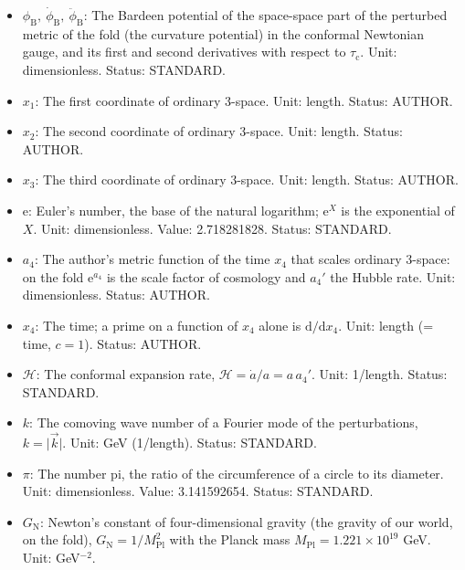 \documentclass[
  10pt,
]{article}
\begin{document}
\begin{itemize}
  \(\tau_{\mathrm{c}}\): The conformal time of the fold,
  \(\mathrm{d}\tau_{\mathrm{c}} = \mathrm{e}^{-a_4}\mathrm{d}x_4\) (the
  time divided by the scale factor \(\mathrm{e}^{a_4}\) of the fold); a
  dot on a quantity of the cosmological perturbations is
  \(\mathrm{d}/\mathrm{d}\tau_{\mathrm{c}}\). Unit: length (= time).
  Status: STANDARD.
\item
  \(\phi_{\mathrm{B}},\ \dot\phi_{\mathrm{B}},\ \ddot\phi_{\mathrm{B}}\):
  The Bardeen potential of the space-space part of the perturbed metric
  of the fold (the curvature potential) in the conformal Newtonian
  gauge, and its first and second derivatives with respect to
  \(\tau_{\mathrm{c}}\). Unit: dimensionless. Status: STANDARD.
\item
  \(x_1\): The first coordinate of ordinary 3-space. Unit: length.
  Status: AUTHOR.
\item
  \(x_2\): The second coordinate of ordinary 3-space. Unit: length.
  Status: AUTHOR.
\item
  \(x_3\): The third coordinate of ordinary 3-space. Unit: length.
  Status: AUTHOR.
\item
  \(\mathrm{e}\): Euler's number, the base of the natural logarithm;
  \(\mathrm{e}^{X}\) is the exponential of \(X\). Unit: dimensionless.
  Value: 2.718281828. Status: STANDARD.
\item
  \(a_4\): The author's metric function of the time \(x_4\) that scales
  ordinary 3-space: on the fold \(\mathrm{e}^{a_4}\) is the scale factor
  of cosmology and \(a_4'\) the Hubble rate. Unit: dimensionless.
  Status: AUTHOR.
\item
  \(x_4\): The time; a prime on a function of \(x_4\) alone is
  \(\mathrm{d}/\mathrm{d}x_4\). Unit: length (= time, \(c = 1\)).
  Status: AUTHOR.
\item
  \(\mathcal{H}\): The conformal expansion rate,
  \(\mathcal{H} = \dot a/a = a\,a_4'\). Unit: 1/length. Status:
  STANDARD.
\item
  \(k\): The comoving wave number of a Fourier mode of the
  perturbations, \(k = \lvert\vec k\rvert\). Unit: GeV (1/length).
  Status: STANDARD.
\item
  \(\pi\): The number pi, the ratio of the circumference of a circle to
  its diameter. Unit: dimensionless. Value: 3.141592654. Status:
  STANDARD.
\item
  \(G_{\mathrm{N}}\): Newton's constant of four-dimensional gravity (the
  gravity of our world, on the fold),
  \(G_{\mathrm{N}} = 1/M_{\mathrm{Pl}}^2\) with the Planck mass
  \(M_{\mathrm{Pl}} = 1.221\times10^{19}\) GeV. Unit: GeV\(^{-2}\).

\end{itemize}
\end{document}

